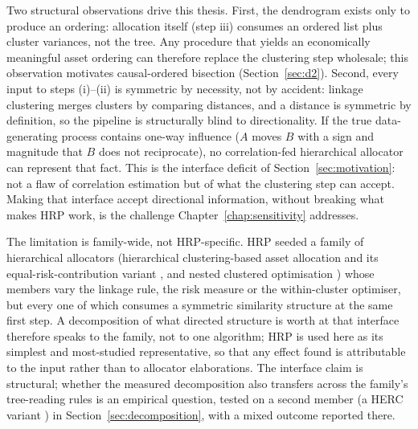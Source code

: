 Two structural observations drive this thesis. First, the dendrogram
exists only to produce an ordering: allocation itself (step iii) consumes an
ordered list plus cluster variances, not the tree. Any procedure that yields
an economically meaningful asset ordering can therefore replace the
clustering step wholesale; this observation motivates causal-ordered
bisection (Section~\ref{sec:d2}). Second, every input to steps
(i)--(ii) is symmetric by necessity, not by accident: linkage clustering
merges clusters by comparing distances, and a distance is symmetric by
definition, so the pipeline is structurally blind to directionality. If the
true data-generating process contains one-way influence ($A$ moves $B$ with
a sign and magnitude that $B$ does not reciprocate), no correlation-fed
hierarchical allocator can represent that fact. This is the interface deficit of
Section~\ref{sec:motivation}: not a flaw of correlation estimation but of
what the clustering step can accept. Making that interface accept directional
information, without breaking what makes HRP work, is the challenge
Chapter~\ref{chap:sensitivity} addresses.

The limitation is family-wide, not HRP-specific. HRP seeded a family of
hierarchical allocators (hierarchical clustering-based asset allocation
and its equal-risk-contribution variant \cite{raffinot2017hierarchical},
and nested clustered optimisation \cite{lopezdeprado2020mlam}) whose members
vary the linkage rule, the risk measure or the within-cluster optimiser,
but every one of which consumes a symmetric similarity structure at the
same first step. A decomposition of what directed structure is worth at
that interface therefore speaks to the family, not to one algorithm; HRP
is used here as its simplest and most-studied representative, so that any
effect found is attributable to the input rather than to allocator
elaborations. The interface claim is structural; whether the
measured decomposition also transfers across the family's
tree-reading rules is an empirical question, tested on a second member
(a HERC variant \cite{raffinot2018herc}) in
Section~\ref{sec:decomposition}, with a mixed outcome reported there.

